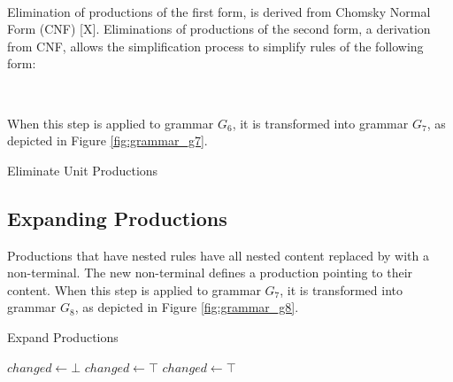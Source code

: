 \documentclass[10pt,nocc]{xrese_report}
\begin{document}
\begin{bnf*}
\\
\end{bnf*}

\noindent Elimination of productions of the first form, is derived from Chomsky Normal Form (CNF) [X]. Eliminations of productions of the second form, a derivation from CNF, allows the simplification process to simplify rules of the following form:

\begin{bnf*}
\\
\end{bnf*}

\noindent When this step is applied to grammar $G_6$, it is transformed into grammar $G_7$, as depicted in Figure \ref{fig:grammar_g7}.

\begin{algorithm}[tb]
\caption{Eliminate Unit Productions}\label{alg:elim_unit_prod}
 \begin{algorithmic}[1]
        \State {}
      \EndIf
    \EndFor
  \EndFunction
 \end{algorithmic}
\end{algorithm}

\subsection{Expanding Productions}

Productions that have nested rules have all nested content replaced by with a non-terminal. The new non-terminal defines a production pointing to their content. When this step is applied to grammar $G_7$, it is transformed into grammar $G_8$, as depicted in Figure \ref{fig:grammar_g8}.

\begin{algorithm}[tb]
\caption{Expand Productions}\label{alg:expand_prod}
 \begin{algorithmic}[1]
    \Repeat
      \State $changed \gets \bot$
              \State {}
              \State $changed \gets \top$
            \EndIf
          \EndFor
            \State {}
            \State $changed \gets \top$
          \EndFor
        \EndIf
      \EndFor
  \EndFunction
 \end{algorithmic}
\end{algorithm}
\end{document}
